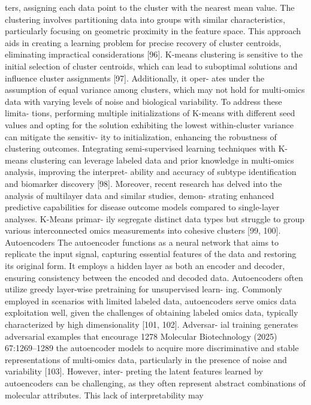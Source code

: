 ters, assigning each data point to the cluster with the nearest
mean value. The clustering involves partitioning data into
groups with similar characteristics, particularly focusing
on geometric proximity in the feature space. This approach
aids in creating a learning problem for precise recovery of
cluster centroids, eliminating impractical considerations
[96]. K-means clustering is sensitive to the initial selection
of cluster centroids, which can lead to suboptimal solutions
and influence cluster assignments [97]. Additionally, it oper-
ates under the assumption of equal variance among clusters,
which may not hold for multi-omics data with varying levels
of noise and biological variability. To address these limita-
tions, performing multiple initializations of K-means with
different seed values and opting for the solution exhibiting
the lowest within-cluster variance can mitigate the sensitiv-
ity to initialization, enhancing the robustness of clustering
outcomes. Integrating semi-supervised learning techniques
with K-means clustering can leverage labeled data and prior
knowledge in multi-omics analysis, improving the interpret-
ability and accuracy of subtype identification and biomarker
discovery [98]. Moreover, recent research has delved into
the analysis of multilayer data and similar studies, demon-
strating enhanced predictive capabilities for disease outcome
models compared to single-layer analyses. K-Means primar-
ily segregate distinct data types but struggle to group various
interconnected omics measurements into cohesive clusters
[99, 100].
Autoencoders
The autoencoder functions as a neural network that aims
to replicate the input signal, capturing essential features of
the data and restoring its original form. It employs a hidden
layer as both an encoder and decoder, ensuring consistency
between the encoded and decoded data. Autoencoders often
utilize greedy layer-wise pretraining for unsupervised learn-
ing. Commonly employed in scenarios with limited labeled
data, autoencoders serve omics data exploitation well, given
the challenges of obtaining labeled omics data, typically
characterized by high dimensionality [101, 102]. Adversar-
ial training generates adversarial examples that encourage
1278
Molecular Biotechnology (2025) 67:1269–1289
the autoencoder models to acquire more discriminative and
stable representations of multi-omics data, particularly in
the presence of noise and variability [103]. However, inter-
preting the latent features learned by autoencoders can be
challenging, as they often represent abstract combinations
of molecular attributes. This lack of interpretability may
